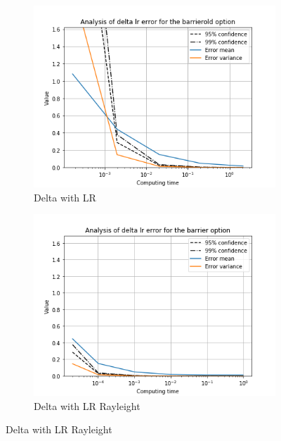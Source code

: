 \documentclass[11pt,a4paper,fleqn]{article}
\begin{document}
\begin{figure}[h!]
  \centering
      \begin{subfigure}[b]{0.45\textwidth}
          \includegraphics[width=\textwidth]{graphs/barrierolddeltalrtime.png}
          \caption{Delta with LR}
      \end{subfigure}
      \begin{subfigure}[b]{0.45\textwidth}
          \includegraphics[width=\textwidth]{graphs/barrierdeltalrtime.png}
          \caption{Delta with LR Rayleight}
      \end{subfigure}


\end{figure}
\end{document}
